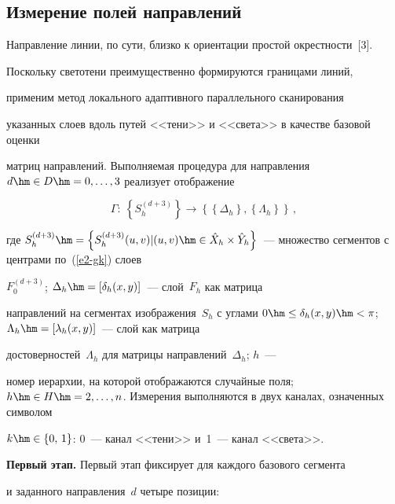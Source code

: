 \subsection{Измерение полей направлений} %





  Направление линии, по сути, близко к ориентации простой окрестности~[3]. 


Поскольку светотени преимущественно формируются границами линий, 


применим метод локального адаптивного параллельного сканирования 


указанных слоев вдоль путей <<тени>> и <<света>> в качестве базовой оценки 


матриц направлений. Выполняемая процедура для направления $d\hm\in 


D\hm=0, \ldots ,3$ реализует отображение


  $$


  \Gamma:\ \left\{ S_h^{(d+3)} \right\} \rightarrow \left\{\left\{ 


\Delta_h\right\},\left\{\Lambda_h\right\}\right\}\,,


  $$


где $S_h^{(d+3)}\hm= \left\{ S_h^{(d+3)}(u,v)\vert (u,v)\hm\in \hat{X}_h\times 


\hat{Y}_h\right\}$~---  множество сегментов с центрами по~(\ref{e2-gk}) слоев 


$F_0^{(d+3)}$; $\Delta_h\hm= [\delta_h(x,y)]$~--- слой~$F_h$ как матрица 


направлений на сегментах изображения~$S_h$ с углами $0\hm\leq 


\delta_h(x,y)\hm<\pi$; $\Lambda_h\hm= [\lambda_h(x,y)]$~--- слой как матрица 


достоверностей~$\Lambda_h$ для матрицы направлений~$\Delta_h$; $h$~--- 


номер иерархии, на которой отображаются случайные поля; $h\hm\in 


H\hm=2, \ldots ,n$. Измерения выполняются в двух каналах, означенных символом 


$k\hm\in \{0,\,1\}$: 0~--- канал <<тени>> и~1~--- канал <<света>>.





  \textbf{Первый этап.} Первый этап фиксирует для каждого базового сегмента 


и заданного направления~$d$ четыре позиции:


